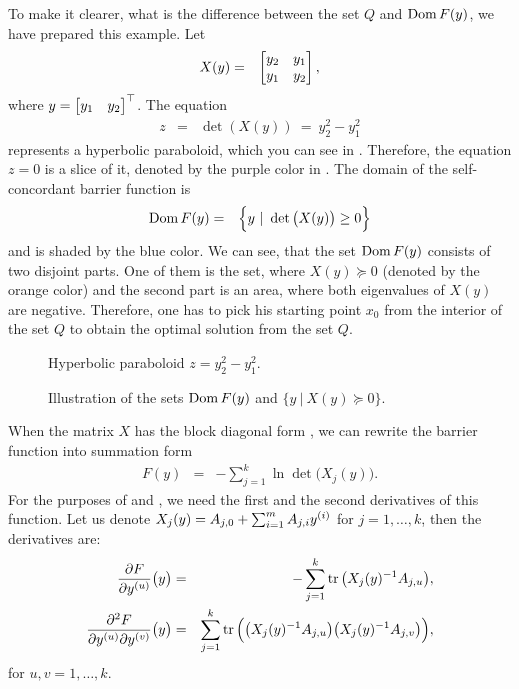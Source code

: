 \begin{example}
  To make it clearer, what is the difference between the set $Q$ and $\operatorname{Dom} F(y)$, we have prepared this example. Let
  \begin{eqnarray}
    X(y) &=& \begin{bmatrix} y_2 & y_1 \\ y_1 & y_2 \end{bmatrix},
  \end{eqnarray}
  where $y = \begin{bmatrix} y_1 & y_2 \end{bmatrix}^\top$. The equation
  \begin{eqnarray}
    z &=& \det(X(y))\ =\ y_2^2 - y_1^2
  \end{eqnarray}
  represents a hyperbolic paraboloid, which you can see in .
  Therefore, the equation $z = 0$ is a slice of it, denoted by the purple color in . The domain of the self-concordant barrier function is
  \begin{eqnarray}
    \operatorname{Dom} F(y) &=& \Big\{y\ |\ \det\big(X(y)\big) \geq 0\Big\}
  \end{eqnarray}
  and is shaded by the blue color.
  We can see, that the set $\operatorname{Dom} F(y)$ consists of two disjoint parts. One of them is the set, where $X(y)\succeq0$ (denoted by the orange color) and the second part is an area, where both eigenvalues of $X(y)$ are negative.
  Therefore, one has to pick his starting point $x_0$ from the interior of the set $Q$ to obtain the optimal solution from the set $Q$.

  \begin{figure}[ht]
    \centering
    \resizebox{0.95\textwidth}{!}{}
    \caption{Hyperbolic paraboloid $z = y_2^2 - y_1^2$.}
  \end{figure}

  \begin{figure}[ht]
    \centering
    \resizebox{0.95\textwidth}{!}{}
    \caption{Illustration of the sets $\operatorname{Dom} F(y)$ and $\big\{y\ |\ X(y) \succeq 0\big\}$.}
  \end{figure}
\end{example}

When the matrix $X$ has the block diagonal form , we can rewrite the barrier function  into summation form
\begin{eqnarray}
  F(y) &=& -\sum_{j=1}^k \ln\det\big(X_j(y)\big).
\end{eqnarray}
For the purposes of  and , we need the first and the second derivatives of this function.
Let us denote $X_j(y) = A_{j, 0} + \sum_{i=1}^mA_{j, i}y^{(i)}$ for $j = 1, \ldots, k$, then the derivatives are:
\begin{eqnarray}
  \frac{\partial F}{\partial y^{(u)}}\big(y\big) &=& -\sum_{j=1}^k \operatorname{tr}\big(X_j(y)^{-1}A_{j,u}\big),\\
  \frac{\partial^2 F}{\partial y^{(u)} \partial y^{(v)}}\big(y\big) &=& \sum_{j=1}^k \operatorname{tr}\Big(\big(X_j(y)^{-1}A_{j,u}\big)\big(X_j(y)^{-1}A_{j,v}\big)\Big),
\end{eqnarray}
for $u, v = 1,\ldots, k$.

